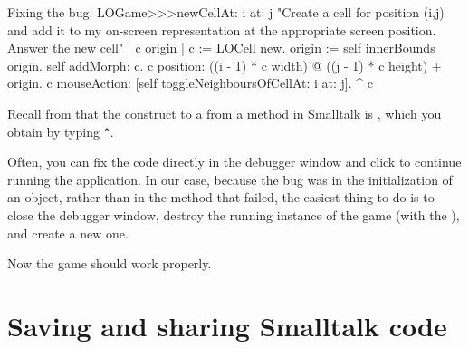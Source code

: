 \documentclass[a4paper,10pt,twoside]{book}
\begin{document}
{\dothis{Close the debugger window.
Add the expression ``\ct{^ c}'' to the end of the method \ct{LOGame>>>newCellAt:at:} so that it returns \ct{c}.
(See \mthref{newCellAt:at:nobug}.)}

\begin{method}{Fixing the bug.}
LOGame>>>newCellAt: i at: j
   "Create a cell for position (i,j) and add it to my on-screen
   representation at the appropriate screen position.  Answer the new cell"
   | c origin |
   c := LOCell new.
   origin := self innerBounds origin.
   self addMorph: c.
   c position: ((i - 1) * c width) @ ((j - 1) * c height) + origin.
   c mouseAction: [self toggleNeighboursOfCellAt: i at: j].
   ^ c
\end{method}

\noindent
Recall from  that the construct to  a  from a method in Smalltalk is \ct{^}, which you obtain by typing \verb|^|.

Often, you can fix the code directly in the debugger window and click  to continue running the application.
In our case, because the bug was in the initialization of an object, rather than in the method that failed, the easiest thing to do is to close the debugger window, destroy the running instance of the game (with the ), and create a new one.


Now the game should work properly.


\section{Saving and sharing Smalltalk code}

}
\end{document}
